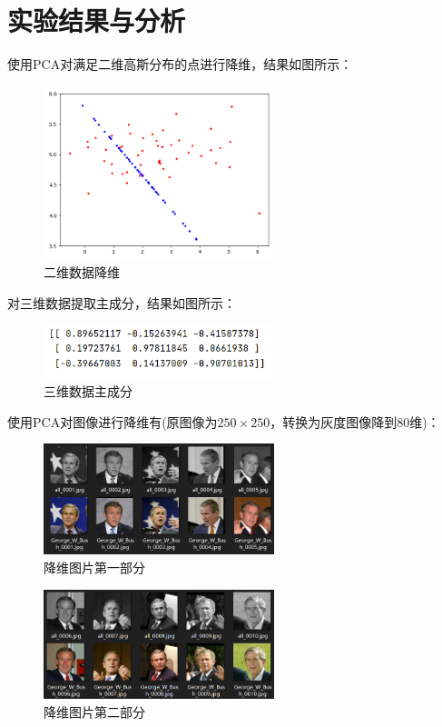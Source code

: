 \documentclass[a4paper,11pt,UTF8]{ctexart}
\newcommand{\bottomcaption}{%
\setlength{\abovecaptionskip}{6pt}%
\setlength{\belowcaptionskip}{6pt}%
\caption}
\begin{document}
\section{实验结果与分析}
使用PCA对满足二维高斯分布的点进行降维，结果如图所示：
\begin{figure}[H]
  \centering
  \includegraphics[width=0.6\textwidth]{2D.png}
  \bottomcaption{二维数据降维}
\end{figure}
对三维数据提取主成分，结果如图所示：
\begin{figure}[H]
  \centering
  \includegraphics[width=0.6\textwidth]{3D_PC.png}
  \bottomcaption{三维数据主成分}
\end{figure}
使用PCA对图像进行降维有(原图像为$250 \times 250$，转换为灰度图像降到80维)：
\begin{figure}[H]
  \centering
  \includegraphics[width=0.6\textwidth]{cmp1.png}
  \bottomcaption{降维图片第一部分}
\end{figure}
\begin{figure}[H]
  \centering
  \includegraphics[width=0.6\textwidth]{cmp2.png}
  \bottomcaption{降维图片第二部分}
\end{figure}
\end{document}
